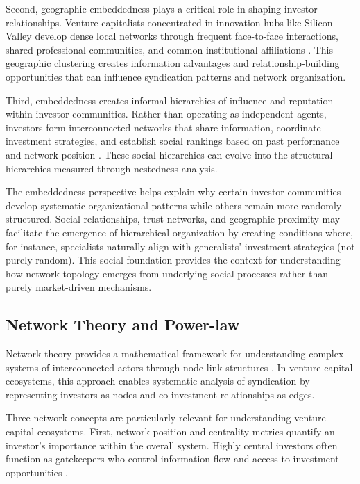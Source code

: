 Second, geographic embeddedness plays a critical role in shaping investor relationships. Venture capitalists concentrated in innovation hubs like Silicon Valley develop dense local networks through frequent face-to-face interactions, shared professional communities, and common institutional affiliations \cite{Granovetter1985}. This geographic clustering creates information advantages and relationship-building opportunities that can influence syndication patterns and network organization.

Third, embeddedness creates informal hierarchies of influence and reputation within investor communities. Rather than operating as independent agents, investors form interconnected networks that share information, coordinate investment strategies, and establish social rankings based on past performance and network position \cite{Granovetter1985}. These social hierarchies can evolve into the structural hierarchies measured through nestedness analysis.

The embeddedness perspective helps explain why certain investor communities develop systematic organizational patterns while others remain more randomly structured. Social relationships, trust networks, and geographic proximity may facilitate the emergence of hierarchical organization by creating conditions where, for instance, specialists naturally align with generalists' investment strategies (not purely random). This social foundation provides the context for understanding how network topology emerges from underlying social processes rather than purely market-driven mechanisms.

\subsection{Network Theory and Power-law}

Network theory provides a mathematical framework for understanding complex systems of interconnected actors through node-link structures \cite{Borgatti2011}. In venture capital ecosystems, this approach enables systematic analysis of syndication by representing investors as nodes and co-investment relationships as edges.

Three network concepts are particularly relevant for understanding venture capital ecosystems. First, network position and centrality metrics quantify an investor's importance within the overall system. Highly central investors often function as gatekeepers who control information flow and access to investment opportunities \cite{Borgatti2011}. 

